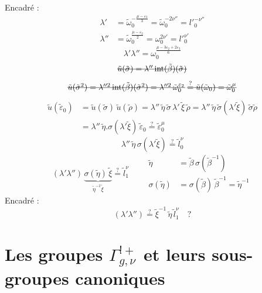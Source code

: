 \documentclass[11pt,a4paper]{article}
\begin{document}
Encadré :
\[
\begin{aligned}
\lambda' &= \tilde\omega_0^{-\frac{\mu - \varepsilon_3}{3}} = \tilde\omega_0^{-2\nu''} = l'^{-\nu''}_0 \\
\lambda'' &= \tilde\omega_0^{\frac{\mu - \varepsilon_2}{2}} = \omega_0^{2\nu'} = l'^{\nu'}_0
\end{aligned}
\]
\[
\lambda'\lambda'' = \omega_0^{\frac{\mu - 3\varepsilon_2 + 2\varepsilon_3}{6}}
\]
\[
\text{\struck{$\tilde u(\tilde\sigma) = \lambda''\,\mathrm{int}(\tilde\beta)(\tilde\sigma)$}}
\]
\[
\text{\struck{$\tilde u(\tilde\sigma^2) = \lambda''^2\,\mathrm{int}(\tilde\beta)(\tilde\sigma^2) = \lambda''^2\,\tilde\omega_0^{\varepsilon_2}$}}
\;\text{\struck{$\overset{?}{=} \tilde u(\tilde\omega_0) = \tilde\omega_0^{\mu}$}}
\]
\[
\begin{aligned}
\tilde u(\tilde\varepsilon_0) &= \tilde u(\tilde\sigma)\,\tilde u(\tilde\rho)
= \lambda''\,\tilde\eta\,\tilde\sigma\,\lambda'\,\tilde\xi\,\tilde\rho
= \lambda''\,\tilde\eta\,\tilde\sigma(\lambda'\tilde\xi)\,\tilde\sigma\tilde\rho \\
&= \lambda''\,\tilde\eta . \sigma(\lambda'\tilde\xi)\,\tilde\varepsilon_0 \overset{?}{=} \tilde\varepsilon_0^{\mu}
\end{aligned}
\]
\[
\lambda''\,\tilde\eta\,\sigma(\lambda'\tilde\xi) \overset{?}{=} \tilde l_0^{\nu}
\]
\[
(\lambda'\lambda'')\,\underbrace{\sigma(\tilde\eta)\,\tilde\xi}_{\tilde\eta^{-1}\tilde\xi} \overset{?}{=} \tilde l_1^{\nu}
\qquad
\begin{aligned}
\tilde\eta &= \tilde\beta\,\sigma(\tilde\beta^{-1}) \\
\sigma(\tilde\eta) &= \sigma(\tilde\beta)\,\tilde\beta^{-1} = \tilde\eta^{-1}
\end{aligned}
\]
Encadré :
\[
(\lambda'\lambda'') \overset{?}{=} \tilde\xi^{-1}\,\tilde\eta\,\tilde l_1^{\nu} \quad ?
\]

\section{Les groupes $\Gamma^{!+}_{g,\nu}$ et leurs sous-groupes canoniques}
\end{document}
